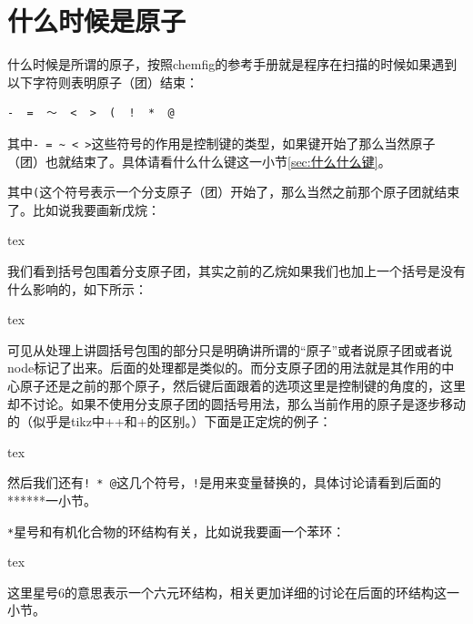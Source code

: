 \documentclass[11pt,oneside]{book}
\begin{document}

\section{什么时候是原子}
什么时候是所谓的原子，按照chemfig的参考手册就是程序在扫描的时候如果遇到以下字符则表明原子（团）结束：
\begin{Verbatim}
-  =  ～  <  >  (  !  *  @
\end{Verbatim}

其中\verb+- = ~ < >+这些符号的作用是控制键的类型，如果键开始了那么当然原子（团）也就结束了。具体请看什么什么键这一小节\ref{sec:什么什么键}。

其中\verb+(+这个符号表示一个分支原子（团）开始了，那么当然之前那个原子团就结束了。比如说我要画新戊烷：
\begin{tcbcode}{tex}
\end{tcbcode}


我们看到括号包围着分支原子团，其实之前的乙烷如果我们也加上一个括号是没有什么影响的，如下所示：
\begin{tcbcode}{tex}
\end{tcbcode}



可见从处理上讲圆括号包围的部分只是明确讲所谓的“原子”或者说原子团或者说node标记了出来。后面的处理都是类似的。而分支原子团的用法就是其作用的中心原子还是之前的那个原子，然后键后面跟着的选项这里是控制键的角度的，这里却不讨论。如果不使用分支原子团的圆括号用法，那么当前作用的原子是逐步移动的（似乎是tikz中++和+的区别。）下面是正定烷的例子：
\begin{tcbcode}{tex}
\end{tcbcode}


然后我们还有\verb+! * @+这几个符号，\verb+!+是用来变量替换的，具体讨论请看到后面的******一小节。

\verb+*+星号和有机化合物的环结构有关，比如说我要画一个苯环：
\begin{tcbcode}{tex}
\end{tcbcode}


这里星号6的意思表示一个六元环结构，相关更加详细的讨论在后面的环结构这一小节。
\end{document}
